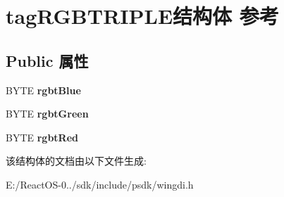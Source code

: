\hypertarget{structtag_r_g_b_t_r_i_p_l_e}{}\section{tag\+R\+G\+B\+T\+R\+I\+P\+L\+E结构体 参考}
\label{structtag_r_g_b_t_r_i_p_l_e}
\subsection*{Public 属性}
\begin{DoxyCompactItemize}
\item 
\mbox{\label{structtag_r_g_b_t_r_i_p_l_e_adbebf9e7802cdfffbdae31c08a71dab7}} 
B\+Y\+TE {\bfseries rgbt\+Blue}
\item 
\mbox{\label{structtag_r_g_b_t_r_i_p_l_e_a2e3e106422819352693de65189cc341f}} 
B\+Y\+TE {\bfseries rgbt\+Green}
\item 
\mbox{\label{structtag_r_g_b_t_r_i_p_l_e_ae61b0771fd3e1e267a3495dcfba5e21c}} 
B\+Y\+TE {\bfseries rgbt\+Red}
\end{DoxyCompactItemize}


该结构体的文档由以下文件生成\+:\begin{DoxyCompactItemize}
\item 
E\+:/\+React\+O\+S-\/0../sdk/include/psdk/wingdi.\+h\end{DoxyCompactItemize}
